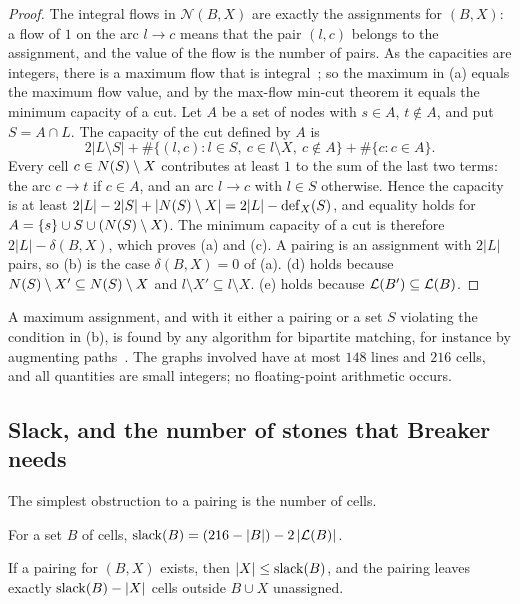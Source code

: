 \begin{proof}
The integral flows in $\mathcal N(B,X)$ are exactly the assignments for $(B,X)$: a flow of $1$ on the arc
$l\to c$ means that the pair $(l,c)$ belongs to the assignment, and the value of the flow is the number of
pairs. As the capacities are integers, there is a maximum flow that is
integral~\cite{FordFulkerson1962}; so the maximum in (a) equals the maximum flow value, and by the
max-flow min-cut theorem it equals the minimum capacity of a cut. Let $A$ be a set of nodes with $s\in A$,
$t\notin A$, and put $S=A\cap L$. The capacity of the cut defined by $A$ is
\[
  2|L\setminus S|+\#\{(l,c): l\in S,\ c\in l\setminus X,\ c\notin A\}+\#\{c : c\in A\}.
\]
Every cell $c\in N(S)\setminus X$ contributes at least $1$ to the sum of the last two terms: the arc
$c\to t$ if $c\in A$, and an arc $l\to c$ with $l\in S$ otherwise. Hence the capacity is at least
$2|L|-2|S|+|N(S)\setminus X|=2|L|-\operatorname{def}_X(S)$, and equality holds for $A=\{s\}\cup S\cup(N(S)\setminus X)$.
The minimum capacity of a cut is therefore $2|L|-\delta(B,X)$, which proves (a) and (c). A pairing is an
assignment with $2|L|$ pairs, so (b) is the case $\delta(B,X)=0$ of (a). (d) holds because
$N(S)\setminus X'\subseteq N(S)\setminus X$ and $l\setminus X'\subseteq l\setminus X$. (e) holds because
$\mathcal{L}(B')\subseteq\mathcal{L}(B)$.
\end{proof}

A maximum assignment, and with it either a pairing or a set $S$ violating the condition in (b), is found
by any algorithm for bipartite matching, for instance by augmenting
paths~\cite{FordFulkerson1962,HopcroftKarp1973}. The graphs involved have at most $148$ lines and $216$
cells, and all quantities are small integers; no floating-point arithmetic occurs.

\subsection{Slack, and the number of stones that Breaker needs}\label{ssec:slack}

The simplest obstruction to a pairing is the number of cells.

\begin{definition}[Slack]\label{def:slack}
For a set $B$ of cells, $\operatorname{slack}(B)=(216-|B|)-2\,|\mathcal{L}(B)|$.
\end{definition}

\begin{lemma}\label{lem:slack-bound}
If a pairing for $(B,X)$ exists, then $|X|\le\operatorname{slack}(B)$, and the pairing leaves exactly $\operatorname{slack}(B)-|X|$
cells outside $B\cup X$ unassigned.
\end{lemma}

